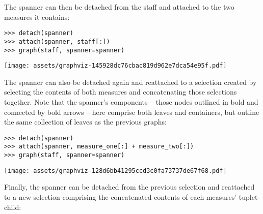 \noindent The spanner can then be detached from the staff and attached to the
two measures it contains:

\begin{comment}
<abjad>
detach(spanner)
attach(spanner, staff[:])
graph(staff, spanner=spanner)
</abjad>
\end{comment}

\begin{abjadbookoutput}
\begin{singlespacing}
\vspace{-0.5\baselineskip}
\begin{lstlisting}
>>> detach(spanner)
>>> attach(spanner, staff[:])
>>> graph(staff, spanner=spanner)
\end{lstlisting}
\noindent\texttt{[image: assets/graphviz-145928dc76cbac819d962e7dca54e95f.pdf]}
\end{singlespacing}
\end{abjadbookoutput}

\noindent The spanner can also be detached again and reattached to a selection
created by selecting the contents of both measures and concatenating those
selections together. Note that the spanner's components -- those nodes outlined
in bold and connected by bold arrows -- here comprise both leaves and
containers, but outline the same collection of leaves as the previous graphs:

\begin{comment}
<abjad>
detach(spanner)
attach(spanner, measure_one[:] + measure_two[:])
graph(staff, spanner=spanner)
</abjad>
\end{comment}

\begin{abjadbookoutput}
\begin{singlespacing}
\vspace{-0.5\baselineskip}
\begin{lstlisting}
>>> detach(spanner)
>>> attach(spanner, measure_one[:] + measure_two[:])
>>> graph(staff, spanner=spanner)
\end{lstlisting}
\noindent\texttt{[image: assets/graphviz-128d6bb41295ccd3c0fa73737de67f68.pdf]}
\end{singlespacing}
\end{abjadbookoutput}

\noindent Finally, the spanner can be detached from the previous selection and
reattached to a new selection comprising the concatenated contents of each
measures' tuplet child:

